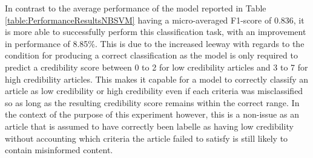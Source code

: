 \documentclass[a4paper,twoside,phd]{BYUPhys}
\begin{document}
In contrast to the average performance of the model reported in Table \ref{table:PerformanceResultsNBSVM} having a micro-averaged F1-score of 0.836, it is more able to successfully perform this classification task, with an improvement in performance of 8.85\%. This is due to the increased leeway with regards to the condition for producing a correct classification as the model is only required to predict a credibility score between 0 to 2 for low credibility articles and 3 to 7 for high credibility articles. This makes it capable for a model to correctly classify an article as low credibility or high credibility even if each criteria was misclassified so as long as the resulting credibility score remains within the correct range. In the context of the purpose of this experiment however, this is a non-issue as an article that is assumed to have correctly been labelle as having low credibility without accounting which criteria the article failed to satisfy is still likely to contain misinformed content.

\begin{table}[H]
	\centering
	\caption{Performance of low credibility identification task via an ensemble approach.}

	\label{table:SingleModelApproach}
\end{table}
\end{document}
